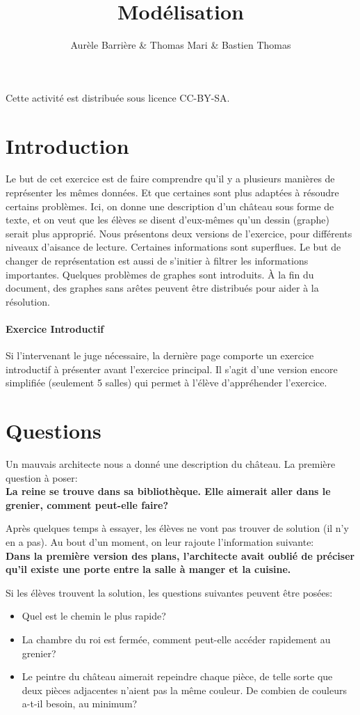 \documentclass[dvipsnames]{article}
\title{\vspace{-2cm}Modélisation}
\author{Aurèle Barrière \& Thomas Mari \& Bastien Thomas}
\date{}
\begin{document}
\maketitle

Cette activité est distribuée sous licence CC-BY-SA.

\section{Introduction}
Le but de cet exercice est de faire comprendre qu'il y a plusieurs manières de représenter les mêmes données.
Et que certaines sont plus adaptées à résoudre certains problèmes.
Ici, on donne une description d'un château sous forme de texte, et on veut que les élèves se disent d'eux-mêmes qu'un dessin (graphe) serait plus approprié.
Nous présentons deux versions de l'exercice, pour différents niveaux d'aisance de lecture.
Certaines informations sont superflues. Le but de changer de représentation est aussi de s'initier à filtrer les informations importantes.
Quelques problèmes de graphes sont introduits.
À la fin du document, des graphes sans arêtes peuvent être distribués pour aider à la résolution.

\paragraph{Exercice Introductif}
Si l'intervenant le juge nécessaire, la dernière page comporte un exercice introductif à présenter avant l'exercice principal.
Il s'agit d'une version encore simplifiée (seulement 5 salles) qui permet à l'élève d'appréhender l'exercice.

\section{Questions}
Un mauvais architecte nous a donné une description du château.
La première question à poser:\\
\textbf{La reine se trouve dans sa bibliothèque. Elle aimerait aller dans le grenier, comment peut-elle faire?}

Après quelques temps à essayer, les élèves ne vont pas trouver de solution (il n'y en a pas).
Au bout d'un moment, on leur rajoute l'information suivante:\\
\textbf{Dans la première version des plans, l'architecte avait oublié de préciser qu'il existe une porte entre la salle à manger et la cuisine.}

Si les élèves trouvent la solution, les questions suivantes peuvent être posées:
\begin{itemize}
\item Quel est le chemin le plus rapide?
\item La chambre du roi est fermée, comment peut-elle accéder rapidement au grenier?
\item Le peintre du château aimerait repeindre chaque pièce, de telle sorte que deux pièces adjacentes n'aient pas la même couleur. De combien de couleurs a-t-il besoin, au minimum?
\end{itemize}
\end{document}
